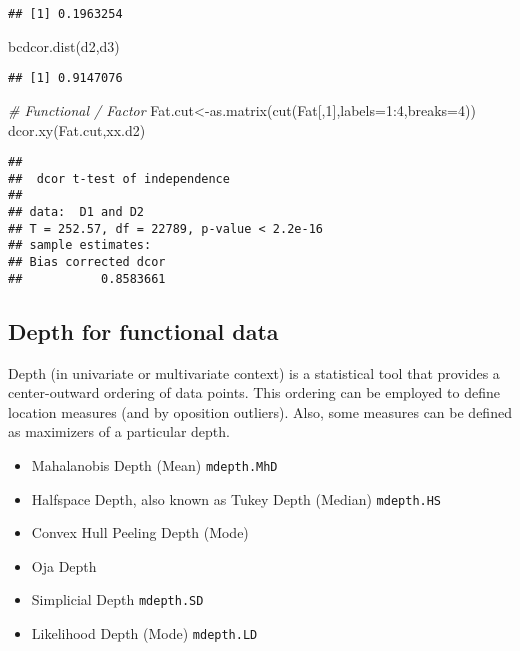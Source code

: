 \documentclass[
]{book}
\newenvironment{Shaded}{\begin{snugshade}}{\end{snugshade}}
\newcommand{\AttributeTok}[1]{\textcolor[rgb]{0.77,0.63,0.00}{#1}}
\newcommand{\CommentTok}[1]{\textcolor[rgb]{0.56,0.35,0.01}{\textit{#1}}}
\newcommand{\DecValTok}[1]{\textcolor[rgb]{0.00,0.00,0.81}{#1}}
\newcommand{\FunctionTok}[1]{\textcolor[rgb]{0.00,0.00,0.00}{#1}}
\newcommand{\NormalTok}[1]{#1}
\newcommand{\OtherTok}[1]{\textcolor[rgb]{0.56,0.35,0.01}{#1}}
\newcommand{\SpecialCharTok}[1]{\textcolor[rgb]{0.00,0.00,0.00}{#1}}
\providecommand{\tightlist}{%
  \setlength{\itemsep}{0pt}\setlength{\parskip}{0pt}}
\begin{document}
\begin{verbatim}
## [1] 0.1963254
\end{verbatim}

\begin{Shaded}
\begin{Highlighting}[]
\FunctionTok{bcdcor.dist}\NormalTok{(d2,d3)}
\end{Highlighting}
\end{Shaded}

\begin{verbatim}
## [1] 0.9147076
\end{verbatim}

\begin{Shaded}
\begin{Highlighting}[]
\CommentTok{\# Functional / Factor}
\NormalTok{Fat.cut}\OtherTok{\textless{}{-}}\FunctionTok{as.matrix}\NormalTok{(}\FunctionTok{cut}\NormalTok{(Fat[,}\DecValTok{1}\NormalTok{],}\AttributeTok{labels=}\DecValTok{1}\SpecialCharTok{:}\DecValTok{4}\NormalTok{,}\AttributeTok{breaks=}\DecValTok{4}\NormalTok{))}
\FunctionTok{dcor.xy}\NormalTok{(Fat.cut,xx.d2)}
\end{Highlighting}
\end{Shaded}

\begin{verbatim}
## 
##  dcor t-test of independence
## 
## data:  D1 and D2
## T = 252.57, df = 22789, p-value < 2.2e-16
## sample estimates:
## Bias corrected dcor 
##           0.8583661
\end{verbatim}

\hypertarget{depth-for-functional-data}{%
\subsection{Depth for functional data}\label{depth-for-functional-data}}

Depth (in univariate or multivariate context) is a statistical tool that provides a center-outward ordering of data points. This ordering can be employed to define location measures (and by oposition outliers). Also, some measures can be defined as maximizers of a particular depth.

\begin{itemize}
\tightlist
\item
  Mahalanobis Depth (Mean) \texttt{mdepth.MhD}
\item
  Halfspace Depth, also known as Tukey Depth (Median) \texttt{mdepth.HS}
\item
  Convex Hull Peeling Depth (Mode)
\item
  Oja Depth
\item
  Simplicial Depth \texttt{mdepth.SD}
\item
  Likelihood Depth (Mode) \texttt{mdepth.LD}
\end{itemize}
\end{document}
